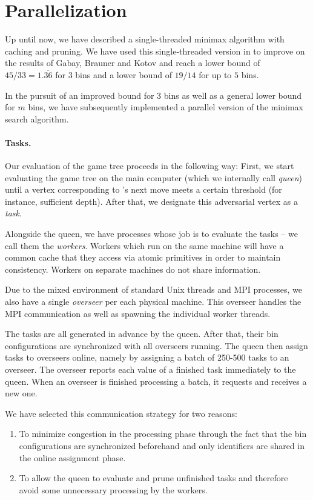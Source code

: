 \section{Parallelization}\label{subsec:para}

Up until now, we have described a single-threaded minimax algorithm
with caching and pruning. We have used this single-threaded version in
\cite{bohm16} to improve on the results of Gabay, Brauner and Kotov
\cite{gabay2013lbv2} and reach a lower bound of $45/33 =
1.\overline{36}$ for $3$ bins and a lower bound of $19/14$ for up to
$5$ bins.

In the pursuit of an improved bound for $3$ bins as well as a general
lower bound for $m$ bins, we have subsequently implemented a parallel
version of the minimax search algorithm.

\paragraph{Tasks.} Our evaluation of the game tree proceeds in the
following way: First, we start evaluating the game tree on the main
computer (which we internally call \emph{queen}) until a vertex
corresponding to \adversary's next move meets a certain threshold (for
instance, sufficient depth). After that, we designate this adversarial
vertex as a \emph{task}.

Alongside the queen, we have processes whose job is to evaluate the
tasks -- we call them the \emph{workers}. Workers which run on the
same machine will have a common cache that they access via atomic
primitives in order to maintain consistency. Workers on separate
machines do not share information.

Due to the mixed environment of standard Unix threads and MPI
processes, we also have a single \emph{overseer} per each physical
machine. This overseer handles the MPI communication as well as
spawning the individual worker threads.

The tasks are all generated in advance by the queen. After that, their
bin configurations are synchronized with all overseers running. The
queen then assign tasks to overseers online, namely by assigning a
batch of 250-500 tasks to an overseer. The overseer reports each value
of a finished task immediately to the queen. When an overseer is
finished processing a batch, it requests and receives a new one.

We have selected this communication strategy for two reasons:

\begin{enumerate}
\item To minimize congestion in the processing phase through the fact
that the bin configurations are synchronized beforehand and only
identifiers are shared in the online assignment phase.
\item To allow the queen to evaluate and prune unfinished tasks and
therefore avoid some unnecessary processing by the workers.
\end{enumerate}

